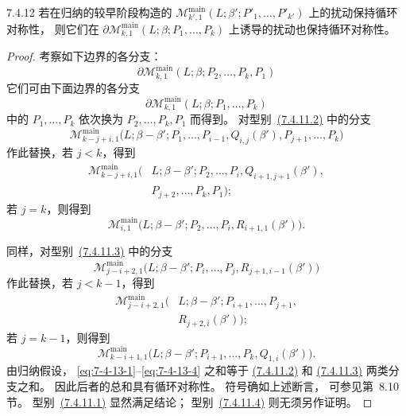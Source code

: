 
\begin{lemma}{7.4.12}\label{lem:7-4-12}
若在归纳的较早阶段构造的
\(
\mathcal M^{\mathrm{main}}_{k',1}
(L;\beta';P'_1,\ldots,P'_{k'})
\)
上的扰动保持循环对称性，
则它们在
\(
\partial\mathcal M^{\mathrm{main}}_{k,1}
(L;\beta;P_1,\ldots,P_k)
\)
上诱导的扰动也保持循环对称性。
\end{lemma}
\begin{proof}
考察如下边界的各分支：
\[
\partial\mathcal M^{\mathrm{main}}_{k,1}
(L;\beta;P_2,\ldots,P_k,P_1)
\]
它们可由下面边界的各分支
\[
\partial\mathcal M^{\mathrm{main}}_{k,1}
(L;\beta;P_1,\ldots,P_k)
\]
中的
\(P_1,\ldots,P_k\)
依次换为
\(P_2,\ldots,P_k,P_1\)
而得到。
对型别~\hyperref[cond:7-4-11-2]{(7.4.11.2)}
中的分支
\[
\mathcal M^{\mathrm{main}}_{k-j+i,1}
\bigl(L;\beta-\beta';
P_1,\ldots,P_{i-1},Q_{i,j}(\beta'),
P_{j+1},\ldots,P_k\bigr)
\]
作此替换，若 \(j<k\)，得到
\begin{equation}
\begin{aligned}
\mathcal M^{\mathrm{main}}_{k-j+i,1}
\bigl(&L;\beta-\beta';
P_2,\ldots,P_i,Q_{i+1,j+1}(\beta'),\\
&P_{j+2},\ldots,P_k,P_1\bigr);
\end{aligned}
\tag{7.4.13.1}\label{eq:7-4-13-1}
\end{equation}
若 \(j=k\)，则得到
\begin{equation}
\mathcal M^{\mathrm{main}}_{i,1}
\bigl(L;\beta-\beta';
P_2,\ldots,P_i,R_{i+1,1}(\beta')\bigr).
\tag{7.4.13.2}\label{eq:7-4-13-2}
\end{equation}

同样，对型别~\hyperref[cond:7-4-11-3]{(7.4.11.3)}
中的分支
\[
\mathcal M^{\mathrm{main}}_{j-i+2,1}
\bigl(L;\beta-\beta';
P_i,\ldots,P_j,R_{j+1,i-1}(\beta')\bigr)
\]
作此替换，若 \(j<k-1\)，得到
\begin{equation}
\begin{aligned}
\mathcal M^{\mathrm{main}}_{j-i+2,1}
\bigl(&L;\beta-\beta';
P_{i+1},\ldots,P_{j+1},\\
&R_{j+2,i}(\beta')\bigr);
\end{aligned}
\tag{7.4.13.3}\label{eq:7-4-13-3}
\end{equation}
若 \(j=k-1\)，则得到
\begin{equation}
\mathcal M^{\mathrm{main}}_{k-i+1,1}
\bigl(L;\beta-\beta';
P_{i+1},\ldots,P_k,Q_{1,i}(\beta')\bigr).
\tag{7.4.13.4}\label{eq:7-4-13-4}
\end{equation}
由归纳假设，
\eqref{eq:7-4-13-1}--\eqref{eq:7-4-13-4}
之和等于
\hyperref[cond:7-4-11-2]{(7.4.11.2)} 和
\hyperref[cond:7-4-11-3]{(7.4.11.3)}
两类分支之和。
因此后者的总和具有循环对称性。
符号确如上述断言，
可参见第~8.10 节。
型别~\hyperref[cond:7-4-11-1]{(7.4.11.1)}
显然满足结论；
型别~\hyperref[cond:7-4-11-4]{(7.4.11.4)}
则无须另作证明。
\end{proof}


